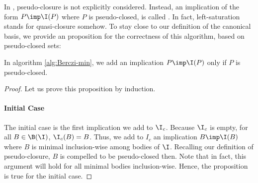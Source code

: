 \noindent In \cite{berczi_directed_2017, boros_strong_2017}, pseudo-closure
is not explicitly considered. Instead, an implication of the form $P \imp \I(P)$ where $P$ is pseudo-closed, is called . In fact, left-saturation stands for quasi-closure somehow. To stay close to our definition of the canonical basis, we provide an proposition for the correctness of this algorithm, based on pseudo-closed sets:

\begin{proposition} In algorithm \ref{alg:Berczi-min}, we add an implication
	$P \imp \I(P)$ only if $P$ is pseudo-closed.
	
\end{proposition}

\begin{proof} Let us prove this proposition by induction. 
	
	\paragraph{Initial Case} The initial case is the first implication we add
	to $\I_c$. Because $\I_c$ is empty, for all $B \in \B(\I)$, $\I_c(B) = B$.
	Thus, we add to $I_c$ an implication $B \imp \I(B)$ where $B$ is minimal
	inclusion-wise among bodies of $\I$. Recalling our definition of 
	pseudo-closure, $B$ is compelled to be pseudo-closed then. Note that in 
	fact,
	this argument will hold for all minimal bodies inclusion-wise. Hence, the 
	proposition is true for the initial case.
	
	\vspace{0.5em}
	

\end{proof}
